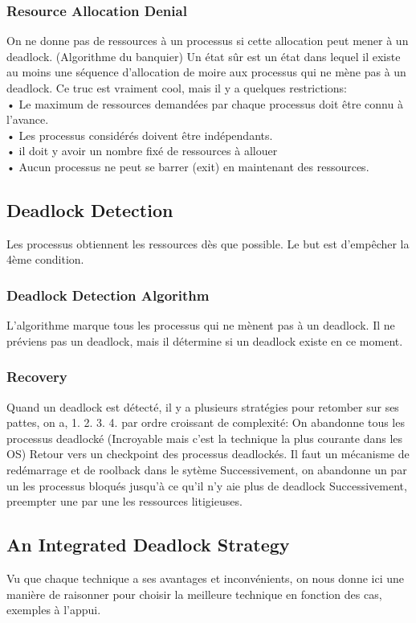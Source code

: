 \subsubsection{Resource Allocation Denial}
On ne donne pas de ressources à un processus si cette allocation peut mener à un deadlock. (Algorithme du banquier)
Un état sûr est un état dans lequel il existe au moins une séquence d'allocation de moire aux processus qui ne mène pas à un deadlock. Ce truc est vraiment cool, mais il y a quelques restrictions:\\
• Le maximum de ressources demandées par chaque processus doit être connu à l'avance.\\
• Les processus considérés doivent être indépendants.\\
• il doit y avoir un nombre fixé de ressources à allouer\\
• Aucun processus ne peut se barrer (exit) en maintenant des ressources.\\
\subsection{Deadlock Detection}
Les processus obtiennent les ressources dès que possible. Le but est d'empêcher la 4ème condition.
\subsubsection{Deadlock Detection Algorithm}
L'algorithme marque tous les processus qui ne mènent pas à un deadlock. Il ne préviens pas un deadlock, mais il détermine si un deadlock existe en ce moment.
\subsubsection{Recovery}
Quand un deadlock est détecté, il y a plusieurs stratégies pour retomber sur ses pattes,
on a, 1.
2. 3. 4.
par ordre croissant de complexité:
On abandonne tous les processus deadlocké (Incroyable mais c'est la technique la plus courante dans les OS)
Retour vers un checkpoint des processus deadlockés. Il faut un mécanisme de redémarrage et de roolback dans le sytème
Successivement, on abandonne un par un les processus bloqués jusqu'à ce qu'il n'y aie plus de deadlock
Successivement, preempter une par une les ressources litigieuses.
\subsection{An Integrated Deadlock Strategy}
Vu que chaque technique a ses avantages et inconvénients, on nous donne ici une manière de raisonner pour choisir la meilleure technique en fonction des cas, exemples à l'appui.
